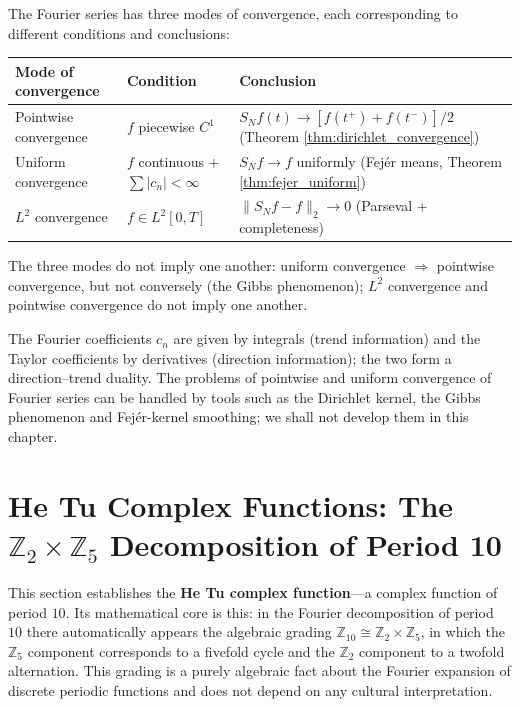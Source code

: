 \begin{remark}\label{rem:fourier_convergence_modes}
The Fourier series has three modes of convergence, each corresponding to different conditions and conclusions:
\begin{center}
\begin{tabular}{@{}>{\raggedright\arraybackslash}p{2.5cm}>{\raggedright\arraybackslash}p{4.0cm}>{\raggedright\arraybackslash}p{5.0cm}@{}}
\toprule
Mode of convergence & Condition & Conclusion \\
\midrule
Pointwise convergence & $f$ piecewise $C^1$ & $S_N f(t) \to [f(t^+)+f(t^-)]/2$ (Theorem \ref{thm:dirichlet_convergence}) \\
Uniform convergence & $f$ continuous + $\sum |c_n| < \infty$ & $S_N f \to f$ uniformly (Fej\'er means, Theorem \ref{thm:fejer_uniform}) \\
$L^2$ convergence & $f \in L^2[0,T]$ & $\|S_N f - f\|_2 \to 0$ (Parseval + completeness) \\
\bottomrule
\end{tabular}
\end{center}
The three modes do not imply one another: uniform convergence $\Rightarrow$ pointwise convergence, but not conversely (the Gibbs phenomenon); $L^2$ convergence and pointwise convergence do not imply one another.
\end{remark}

\begin{remark}\label{rem:fourier_coefficient_duality}
The Fourier coefficients $c_n$ are given by integrals (trend information) and the Taylor coefficients by derivatives (direction information); the two form a direction--trend duality. The problems of pointwise and uniform convergence of Fourier series can be handled by tools such as the Dirichlet kernel, the Gibbs phenomenon and Fej\'er-kernel smoothing; we shall not develop them in this chapter.
\end{remark}

\section{\texorpdfstring{He Tu Complex Functions: The $\mathbb{Z}_2 \times \mathbb{Z}_5$ Decomposition of Period 10}{He Tu Complex Functions}}
\label{sec:hetu_function}

This section establishes the \textbf{He Tu complex function}---a complex function of period $10$. Its mathematical core is this: in the Fourier decomposition of period $10$ there automatically appears the algebraic grading $\mathbb{Z}_{10} \cong \mathbb{Z}_2 \times \mathbb{Z}_5$, in which the $\mathbb{Z}_5$ component corresponds to a fivefold cycle and the $\mathbb{Z}_2$ component to a twofold alternation. This grading is a purely algebraic fact about the Fourier expansion of discrete periodic functions and does not depend on any cultural interpretation.


